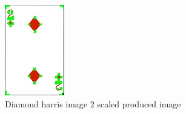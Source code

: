 \documentclass[conference]{IEEEtran}
\begin{document}
\begin{figure}[!htb]
\begin{minipage}[b]{0.2\textwidth}
    \includegraphics[width=\textwidth]{../programme/results/Task_1/scaled_experiements/Harris/diamond/image_2.jpg}
    \caption{Diamond harris image 2 scaled produced image}
    \label{Diamond harris image 2 scaled produced image}
  \end{minipage}
  \hfill
    \begin{minipage}[b]{0.2\textwidth}

\end{minipage}
\end{figure}
\end{document}

